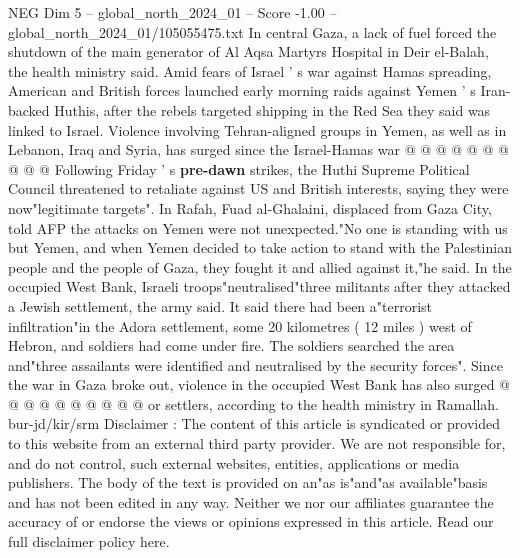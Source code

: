 \begin{textsample}{NEG Dim 5 – global\_north\_2024\_01 – Score -1.00 – global\_north\_2024\_01/105055475.txt}
In central Gaza, a lack of fuel forced the shutdown of the main generator of Al Aqsa Martyrs Hospital in Deir el-Balah, the health ministry said.
Amid fears of Israel ' s war against Hamas spreading, American and British forces launched early morning raids against Yemen ' s Iran-backed Huthis, after the rebels targeted shipping in the Red Sea they said was linked to Israel.
Violence involving Tehran-aligned groups in Yemen, as well as in Lebanon, Iraq and Syria, has surged since the Israel-Hamas war @ @ @ @ @ @ @ @ @ @ Following Friday ' s \textbf{pre-dawn} strikes, the Huthi Supreme Political Council threatened to retaliate against US and British interests, saying they were now"legitimate targets".
In Rafah, Fuad al-Ghalaini, displaced from Gaza City, told AFP the attacks on Yemen were not unexpected."No one is standing with us but Yemen, and when Yemen decided to take action to stand with the Palestinian people and the people of Gaza, they fought it and allied against it,"he said.
In the occupied West Bank, Israeli troops"neutralised"three militants after they attacked a Jewish settlement, the army said.
It said there had been a"terrorist infiltration"in the Adora settlement, some 20 kilometres ( 12 miles ) west of Hebron, and soldiers had come under fire.
The soldiers searched the area and"three assailants were identified and neutralised by the security forces".
Since the war in Gaza broke out, violence in the occupied West Bank has also surged @ @ @ @ @ @ @ @ @ @ or settlers, according to the health ministry in Ramallah. bur-jd/kir/srm Disclaimer : The content of this article is syndicated or provided to this website from an external third party provider.
We are not responsible for, and do not control, such external websites, entities, applications or media publishers.
The body of the text is provided on an"as is"and"as available"basis and has not been edited in any way.
Neither we nor our affiliates guarantee the accuracy of or endorse the views or opinions expressed in this article.
Read our full disclaimer policy here.

\end{textsample}
